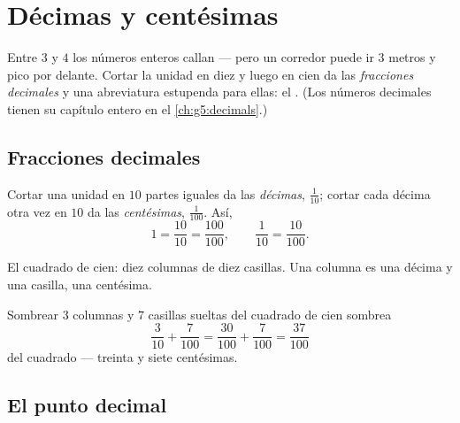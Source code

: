\chapter{Décimas y centésimas}\label{ch:g4:decimals}

Entre $3$ y $4$ los números enteros callan --- pero un corredor puede
ir $3$ metros y pico por delante. Cortar la unidad en diez y luego en
cien da las \emph{fracciones decimales} y una abreviatura estupenda
para ellas: el . (Los números decimales tienen su
capítulo entero en el \cref{ch:g5:decimals}.)

\section{Fracciones decimales}

\begin{definition}\label{def:g4:decimals:def}
Cortar una unidad en $10$ partes iguales da las \emph{décimas},
$\frac{1}{10}$; cortar cada décima otra vez en $10$ da las
\emph{centésimas}, $\frac{1}{100}$. Así,
\[
1 = \frac{10}{10} = \frac{100}{100},
\qquad
\frac{1}{10} = \frac{10}{100}.
\]
\end{definition}

\begin{omfigure}

{\small El cuadrado de cien: diez columnas de diez casillas. Una columna es una
décima y una casilla, una centésima.}
\end{omfigure}

\begin{example}\label{ex:g4:decimals:count}
Sombrear $3$ columnas y $7$ casillas sueltas del cuadrado de cien sombrea
\[
\frac{3}{10} + \frac{7}{100} = \frac{30}{100} + \frac{7}{100}
= \frac{37}{100}
\]
del cuadrado --- treinta y siete centésimas.
\end{example}

\section{El punto decimal}

